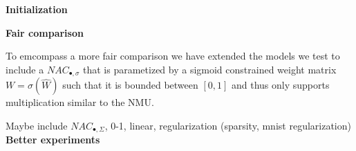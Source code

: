 \documentclass{article}
\begin{document}
%
\textbf{Initialization}

\textbf{Fair comparison}


To emcompass a more fair comparison we have extended the models we test to include a $NAC_{\bullet,\sigma}$ that is parametized by a sigmoid constrained weight matrix $W = \sigma(\hat{W})$ such that it is bounded between $[0,1]$ and thus only supports multiplication similar to the NMU.

Maybe include $NAC_{\bullet,\Sigma}$, 0-1, linear, regularization (sparsity, mnist regularization)\\

\textbf{Better experiments}\\

\end{document}
